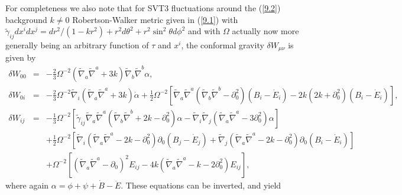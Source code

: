 \documentclass[aps,onecolumn,10pt]{revtex4}
\numberwithin{equation}{section}
\numberwithin{equation}{section}
\begin{document}
For completeness we also note that for  SVT3 fluctuations around the (\ref{9.2}) background $k\neq 0$ Robertson-Walker metric given in (\ref{9.1}) with $\tilde{\gamma}_{ij}dx^idx^j=dr^2/(1-kr^2)+r^2d\theta^2+r^2\sin^2\theta d\phi^2$ and with $\Omega$ actually now more generally being an arbitrary function of $\tau$ and $x^i$, the conformal gravity $\delta W_{\mu\nu}$ is given by 
%
\begin{eqnarray}
\delta W_{00}&=& - \tfrac{2}{3} \Omega^{-2} (\tilde\nabla_a\tilde\nabla^a + 3k)\tilde\nabla_b\tilde\nabla^b \alpha,
 \nonumber\\ 
\delta W_{0i}&=& -\tfrac{2}{3} \Omega^{-2}  \tilde\nabla_i (\tilde\nabla_a\tilde\nabla^a + 3k)\dot\alpha
+\tfrac12 \Omega^{-2}\left[ \tilde\nabla_a\tilde\nabla^a (\tilde\nabla_b \tilde\nabla^b-\partial_0^2)(B_i-\dot{E}_i) -2k(2k+\partial_0^2)(B_i-\dot{E}_i)\right],
  \nonumber\\ 
\delta W_{ij}&=& -\tfrac{1}{3} \Omega^{-2} \left[ \tilde{\gamma}_{ij} \tilde\nabla_a\tilde\nabla^a (\tilde\nabla_b \tilde\nabla^b +2k-\partial_0^2)\alpha - \tilde\nabla_i\tilde\nabla_j(\tilde\nabla_a\tilde\nabla^a - 3\partial_0^2)\alpha \right]
\nonumber\\
&& +\tfrac{1}{2} \Omega^{-2} \left[ \tilde\nabla_i ( \tilde\nabla_a\tilde\nabla^a -2k-\partial_0^2) \partial_0 (B_j-\dot{E}_j) 
+  \tilde\nabla_j ( \tilde\nabla_a\tilde\nabla^a -2k-\partial_0^2) \partial_0 (B_i-\dot{E}_i)\right]
\nonumber\\
&&+ \Omega^{-2}\left[ (\tilde\nabla_a\tilde\nabla^a-\partial_0)^2 E_{ij} - 4k (\tilde\nabla_a\tilde\nabla^a - k-2\partial_0^2)E_{ij} \right],
\label{13.16}
\end{eqnarray}
%
where again $\alpha = \phi + \psi + \dot B - \ddot E$. These equations can be inverted, and yield
%
\end{document}

